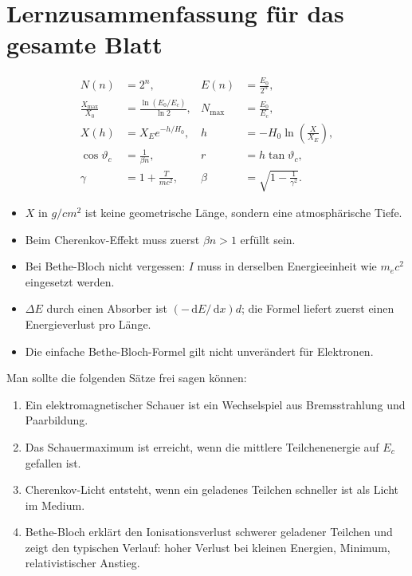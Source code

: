 \documentclass[11pt,a4paper]{scrartcl}
\newcommand{\paren}[1]{\left( #1 \right)}
\newcommand{\dd}{\,\mathrm{d}}
\theoremstyle{definition}
\theoremstyle{plain}
\theoremstyle{remark}
\begin{document}
\section{Lernzusammenfassung f\"ur das gesamte Blatt}

\begin{summarybox}[title=Die wichtigsten Formeln]
\begin{align*}
    N(n)&=2^n, & E(n)&=\frac{E_0}{2^n},\\
    \frac{X_{\max}}{X_0}&=\frac{\ln(E_0/E_c)}{\ln 2}, & N_{\max}&=\frac{E_0}{E_c},\\
    X(h)&=X_Ee^{-h/H_0}, & h&=-H_0\ln\paren{\frac{X}{X_E}},\\
    \cos\vartheta_c&=\frac{1}{\beta n}, & r&=h\tan\vartheta_c,\\
    \gamma&=1+\frac{T}{mc^2}, & \beta&=\sqrt{1-\frac{1}{\gamma^2}}.
\end{align*}
\end{summarybox}

\begin{warningbox}[title=Typische Fehlerquellen]
\begin{itemize}
    \item $X$ in $\si{g/cm^2}$ ist keine geometrische L\"ange, sondern eine atmosph\"arische Tiefe.
    \item Beim Cherenkov-Effekt muss zuerst $\beta n>1$ erf\"ullt sein.
    \item Bei Bethe-Bloch nicht vergessen: $I$ muss in derselben Energieeinheit wie $m_ec^2$ eingesetzt werden.
    \item $\Delta E$ durch einen Absorber ist $(-\dd E/\dd x)d$; die Formel liefert zuerst einen Energieverlust pro L\"ange.
    \item Die einfache Bethe-Bloch-Formel gilt nicht unver\"andert f\"ur Elektronen.
\end{itemize}
\end{warningbox}

\begin{notebox}[title=Mini-Check vor einem Tafelvortrag]
Man sollte die folgenden S\"atze frei sagen k\"onnen:
\begin{enumerate}
    \item Ein elektromagnetischer Schauer ist ein Wechselspiel aus Bremsstrahlung und Paarbildung.
    \item Das Schauermaximum ist erreicht, wenn die mittlere Teilchenenergie auf $E_c$ gefallen ist.
    \item Cherenkov-Licht entsteht, wenn ein geladenes Teilchen schneller ist als Licht im Medium.
    \item Bethe-Bloch erkl\"art den Ionisationsverlust schwerer geladener Teilchen und zeigt den typischen Verlauf: hoher Verlust bei kleinen Energien, Minimum, relativistischer Anstieg.
\end{enumerate}
\end{notebox}
\end{document}
